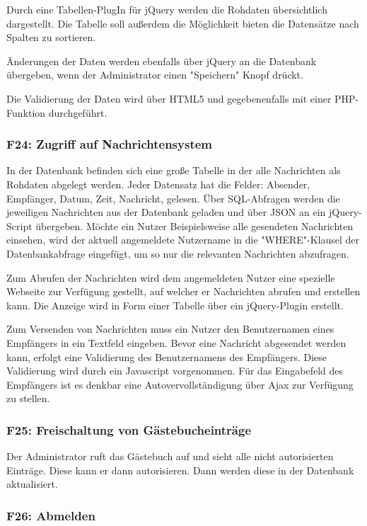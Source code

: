 \documentclass[10pt,a4paper]{scrartcl}
\begin{document}
Durch eine Tabellen-PlugIn für jQuery werden die Rohdaten übersichtlich dargestellt.
Die Tabelle soll außerdem die Möglichkeit bieten die Datensätze nach Spalten zu sortieren.

Änderungen der Daten werden ebenfalls über jQuery an die Datenbank übergeben, wenn der Administrator
einen "Speichern" Knopf drückt.

Die Validierung der Daten wird über HTML5 und gegebenenfalls mit einer PHP-Funktion durchgeführt.

\subsubsection*{F24: Zugriff auf Nachrichtensystem}

In der Datenbank befinden sich eine große Tabelle in der alle Nachrichten als Rohdaten abgelegt werden.
Jeder Datensatz hat die Felder: Absender, Empfänger, Datum, Zeit, Nachricht, gelesen.
Über SQL-Abfragen werden die jeweiligen Nachrichten aus der Datenbank geladen und über JSON an ein
jQuery-Script übergeben. Möchte ein Nutzer Beispielsweise alle gesendeten Nachrichten einsehen, wird
der aktuell angemeldete Nutzername in die "WHERE"-Klausel der Datenbankabfrage eingefügt, um so nur 
die relevanten Nachrichten abzufragen.

Zum Abrufen der Nachrichten wird dem angemeldeten Nutzer eine spezielle Webseite zur Verfügung gestellt,
auf welcher er Nachrichten abrufen und erstellen kann. Die Anzeige wird in Form einer Tabelle über
ein jQuery-Plugin erstellt. 

Zum Versenden von Nachrichten muss ein Nutzer den Benutzernamen eines Empfängers in ein Textfeld eingeben.
Bevor eine Nachricht abgesendet werden kann, erfolgt eine Validierung des Benutzernamens des Empfängers.
Diese Validierung wird durch ein Javascript vorgenommen. 
Für das Eingabefeld des Empfängers ist es denkbar eine Autovervollständigung über Ajax zur Verfügung zu stellen. 

\subsubsection*{F25: Freischaltung von Gästebucheinträge}

Der Administrator ruft das Gästebuch auf und sieht alle nicht autorisierten Einträge. Diese kann er dann autorisieren. Dann werden diese in der Datenbank aktualisiert.

\subsubsection*{F26: Abmelden}
\end{document}
